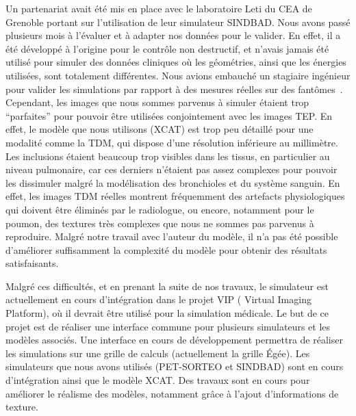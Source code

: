 Un partenariat avait été mis en place avec le laboratoire Leti du CEA de
Grenoble portant sur l'utilisation de leur simulateur SINDBAD. Nous avons passé
plusieurs mois à l'évaluer et à adapter nos données pour le valider. En effet,
il a été développé à l'origine pour le contrôle non destructif, et n'avais
jamais été utilisé pour simuler des données cliniques où les géométries, ainsi
que les énergies utilisées, sont totalement différentes. Nous avions embauché un
stagiaire ingénieur pour valider les simulations par rapport à des mesures
réelles sur des fantômes~\cite{leduvehat}. Cependant, les images que nous sommes parvenus à simuler étaient trop
``parfaites'' pour pouvoir être utilisées conjointement avec les images TEP. En
effet, le modèle que nous utilisons (XCAT) est trop peu détaillé pour une
modalité comme la TDM, qui dispose d'une résolution inférieure au millimètre. Les
inclusions étaient beaucoup trop visibles dans les tissus, en particulier
au niveau pulmonaire, car ces derniers n'étaient pas assez complexes pour
pouvoir les dissimuler malgré la modélisation des bronchioles et du système
sanguin. En effet, les images TDM réelles montrent fréquemment des artefacts
physiologiques qui doivent être éliminés par le radiologue, ou encore,
notamment pour le poumon, des textures très complexes que nous ne sommes pas
parvenus à reproduire. Malgré notre travail avec l'auteur du modèle, il n'a pas
été possible d'améliorer suffisamment la complexité du modèle pour obtenir des
résultats satisfaisants. 

Malgré ces difficultés, et en prenant la suite de nos travaux, le simulateur est
actuellement en cours d'intégration dans le projet  VIP ( Virtual Imaging Platform), où il devrait être
utilisé pour la simulation médicale. Le but de ce projet est de réaliser
une interface commune pour plusieurs simulateurs et les modèles associés. Une
interface en cours de développement permettra de réaliser les simulations sur
une grille de calculs (actuellement la grille Égée). Les simulateurs que nous
avons utilisés (PET-SORTEO et SINDBAD) sont en cours d'intégration ainsi
que le modèle XCAT. Des travaux sont en cours pour améliorer le réalisme des
modèles, notamment grâce à l'ajout d'informations de texture.  



